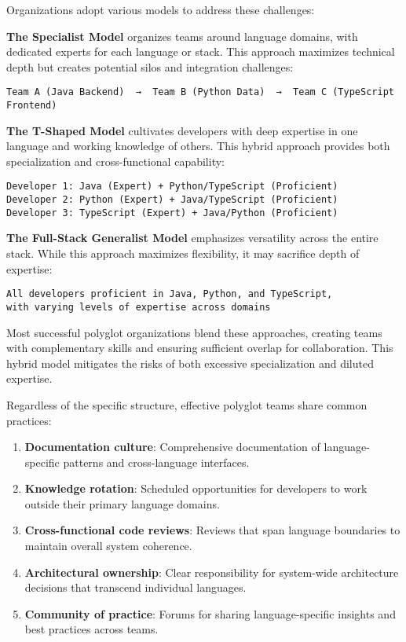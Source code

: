 \documentclass[11pt]{article}
\begin{document}
Organizations adopt various models to address these challenges:

\textbf{\textbf{The Specialist Model}} organizes teams around language domains, with dedicated experts for each language or stack. This approach maximizes technical depth but creates potential silos and integration challenges:

\begin{verbatim}
Team A (Java Backend)  →  Team B (Python Data)  →  Team C (TypeScript Frontend)
\end{verbatim}

\textbf{\textbf{The T-Shaped Model}} cultivates developers with deep expertise in one language and working knowledge of others. This hybrid approach provides both specialization and cross-functional capability:

\begin{verbatim}
Developer 1: Java (Expert) + Python/TypeScript (Proficient)
Developer 2: Python (Expert) + Java/TypeScript (Proficient)
Developer 3: TypeScript (Expert) + Java/Python (Proficient)
\end{verbatim}

\textbf{\textbf{The Full-Stack Generalist Model}} emphasizes versatility across the entire stack. While this approach maximizes flexibility, it may sacrifice depth of expertise:

\begin{verbatim}
All developers proficient in Java, Python, and TypeScript,
with varying levels of expertise across domains
\end{verbatim}

Most successful polyglot organizations blend these approaches, creating teams with complementary skills and ensuring sufficient overlap for collaboration. This hybrid model mitigates the risks of both excessive specialization and diluted expertise.

Regardless of the specific structure, effective polyglot teams share common practices:

\begin{enumerate}
\item \textbf{Documentation culture}: Comprehensive documentation of language-specific patterns and cross-language interfaces.

\item \textbf{Knowledge rotation}: Scheduled opportunities for developers to work outside their primary language domains.

\item \textbf{Cross-functional code reviews}: Reviews that span language boundaries to maintain overall system coherence.

\item \textbf{Architectural ownership}: Clear responsibility for system-wide architecture decisions that transcend individual languages.

\item \textbf{Community of practice}: Forums for sharing language-specific insights and best practices across teams.
\end{enumerate}
\end{document}
